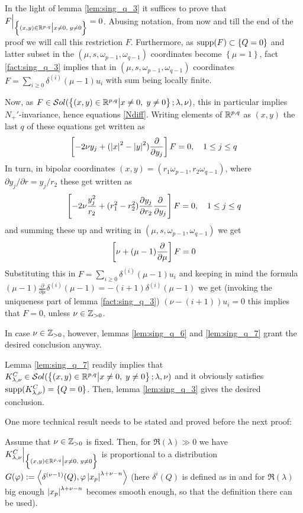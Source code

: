 \documentclass[10pt]{article} %
\theoremstyle{definition}
\theoremstyle{remark}
\begin{document}
\begin{myproof}
	In the light of lemma \ref{lem:sing_q_3} it suffices to prove that $F\Big|_{\mysetn{(x,y)\in\R^{p,q}}{x\neq0,\;y\neq0}}=0$.
	Abusing notation, from now and till the end of the proof we will call this restriction $F$.
	Furthermore, as $\supp(F)\subset\left\{ Q=0 \right\}$ and latter subset in the $(\mu,s,\omega_{p-1},\omega_{q-1})$ coordinates
	become $\left\{ \mu=1 \right\}$, fact \ref{fact:sing_q_3}
	implies that in $(\mu,s,\omega_{p-1},\omega_{q-1})$ coordinates 
	$F=\sum_{i\geq0}\delta^{(i)}(\mu-1)u_i$ with sum being locally finite.

	Now, as $F\in\sol[\mysetn{(x,y)\in\R^{p,q}}{x\neq0,\;y\neq0}]$, this in particular
	implies $N_+'$-invariance, hence equations \eqref{Ndiff}. Writing elements of $\R^{p,q}$
	as $(x,y)$ the last $q$ of these equations get written as \[\left[ -2\nu y_j+(\myabs{x}^2-\myabs{y}^2)\frac{\partial}{
	\partial y_j} \right]F=0,\quad1\leq j\leq q\]
	In turn, in bipolar coordinates $(x,y)=(r_1\omega_{p-1},r_2\omega_{q-1})$, where $\partial y_j/\partial r=
	y_j/r_2$ these get written as
	\[\mysbra{-2\nu \frac{y_j^2}{r_2}+(r_1^2-r_2^2)\frac{\partial y_j}{\partial r_2}\frac{\partial}{\partial y_j}}F=0,\quad
	1\leq j\leq q\]
	and summing these up and writing in $(\mu,s,\omega_{p-1},\omega_{q-1})$ we get
	\[\mysbra{\nu+(\mu-1)\frac{\partial}{\partial\mu}}F=0\]
	Substituting this in 
	$F=\sum_{i\geq0}\delta^{(i)}(\mu-1)u_i$ and keeping in mind the formula $(\mu-1)\frac{\partial}{\partial\mu}\delta^{(i)}
	(\mu-1)=-(i+1)\delta^{(i)}(\mu-1)$ we get (invoking the uniqueness part of lemma \ref{fact:sing_q_3})
	$(\nu-(i+1))u_i=0$ this implies that $F=0$, unless $\nu\in\Z_{>0}$.

	In case $\nu\in\Z_{>0}$, however, lemmas \ref{lem:sing_q_6} and \ref{lem:sing_q_7} grant the desired conclusion anyway.
\end{myproof}
\begin{myproof}
	Lemma \ref{lem:sing_q_7} readily implies that $K^C_{\lambda,\nu}\in\sol[\Upp]$
	and it obviously satisfies $\supp(K^C_{\lambda,\nu})=\left\{ Q=0 \right\}$.
	Then, lemma \ref{lem:sing_q_3} gives the desired conclusion.
\end{myproof}
One more technical result needs to be stated and proved before the next proof:
\begin{mylem}
	\label{lem:sing_q_8}
	Assume that $\nu\in\Z_{>0}$ is fixed. Then, for $\Re(\lambda)\gg0$ we have
	$K_{\lambda,\nu}^C\Big|_{\Upp}$ is proportional to a distribution
	$G(\varphi):=\myabra{\delta^{(\nu-1)}(Q),\varphi\myabs{x_p}^{\lambda+\nu-n}}$
	(here $\delta^{i}(Q)$ is defined as in
	\cite[ch. III, sec. 2.1]{gelfand1980distribution} and for $\Re(\lambda)$ big enough $\myabs{x_p}^{\lambda+\nu-n}$ becomes
	smooth enough, so that the definition there can be used).
\end{mylem}
\end{document}
